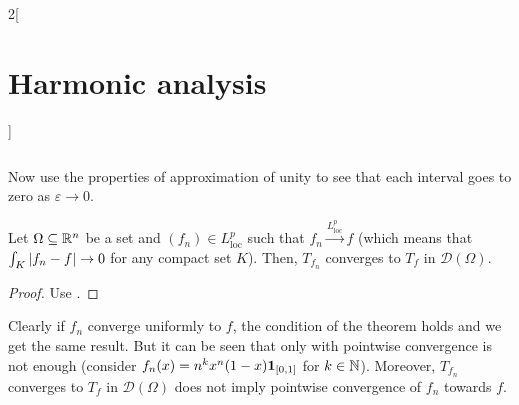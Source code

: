 \documentclass[../../../main_math.tex]{subfiles}
\begin{document}
\begin{multicols}{2}[\section{Harmonic analysis}]
\begin{sproof}
\begin{align*}
\begin{split}
      \end{split}
    \end{align*}
    Now use the properties of approximation of unity to see that each interval goes to zero as $\varepsilon\to 0$.
  \end{sproof}
  \begin{theorem}
    Let $\Omega\subseteq \mathbb{R}^n$ be a set and $(f_n)\in L_\mathrm{loc}^p$ such that $f_n\overset{L_\mathrm{loc}^p}{\longrightarrow}f$ (which means that $\int_K\abs{f_n-f}\to 0$ for any compact set $K$). Then, $T_{f_n}$ converges to $T_f$ in $\mathcal{D}(\Omega)$.
  \end{theorem}
  \begin{proof}
    Use .
  \end{proof}
  \begin{remark}
    Clearly if $f_n$ converge uniformly to $f$, the condition of the theorem holds and we get the same result. But it can be seen that only with pointwise convergence is not enough (consider $f_n(x)=n^kx^n(1-x)\boldsymbol{\mathrm{1}}_{[0,1]}$ for $k\in\mathbb{N}$). Moreover, $T_{f_n}$ converges to $T_f$ in $\mathcal{D}(\Omega)$ does not imply pointwise convergence of $f_n$ towards $f$.
  \end{remark}

\end{multicols}
\end{document}

